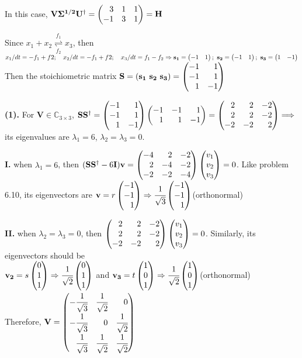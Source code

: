 \documentclass[12pt,a4paper]{article}
\begin{document}
    \noindent In this case, $\mathbf{V\Sigma^{1/2}U^\dagger}=\newvec{3&1&1\\-1&3&1}=\mathbf{H}$

    \newpage 
    Since $x_1+x_2\stackrel{f_1}{\underset{f_2}{\rightleftharpoons}}x_3$, then \\
    $x_1/dt=-f_1+f2;\quad x_2/dt=-f_1+f2;\quad x_3/dt=f_1-f_2\Rightarrow
    \\ \mathbf{s_1}=\newvec{-1&1};\ \mathbf{s_2}=\newvec{-1&1};\ \mathbf{s_3}=\newvec{1&-1}$\\
    Then the stoichiometric matrix $\mathbf{S=(s_1\ s_2\ s_3)}=\newvec{-1&1\\-1&1\\1&-1}$

    \noindent \textbf{(1).} For $\mathbf{V}\in\mathbb{C}_{3\times 3}$, $\mathbf{SS^\dagger}=\newvec{-1&1\\-1&1\\1&-1}\newvec{-1&-1&1\\1&1&-1}=\newvec{2&2&-2\\2&2&-2\\-2&-2&2}\Longrightarrow$ its eigenvalues are $\lambda_1=6$, $\lambda_2=\lambda_3=0$. 

    \noindent \textbf{I.} when $\lambda_1=6$, then $\mathbf{(SS^\dagger-\textnormal{6}I)v}=\newvec{-4&2&-2\\2&-4&-2\\-2&-2&-4}\newvec{v_1\\v_2\\v_3}=0$. Like problem 6.10, its eigenvectors are $\mathbf{v}=r\newvec{-1\\-1\\1}\Rightarrow\sqrtfrac{1}{3}\newvec{-1\\-1\\1}$(orthonormal)

    \noindent \textbf{II.} when $\lambda_2=\lambda_3=0$, then $\newvec{2&2&-2\\2&2&-2\\-2&-2&2}\newvec{v_1\\v_2\\v_3}=0$. Similarly, its eigenvectors should be \\
    $\mathbf{v_2}=s\newvec{0\\1\\1}\Rightarrow\sqrtfrac{1}{2}\newvec{0\\1\\1}$ and $\mathbf{v_3}=t\newvec{1\\0\\1}\Rightarrow\sqrtfrac{1}{2}\newvec{1\\0\\1}$(orthonormal)\\
    Therefore, $\mathbf{V}=\newvec{-\sqrtfrac{1}{3}&\sqrtfrac{1}{2}&0\\-\sqrtfrac{1}{3}&0&\sqrtfrac{1}{2}\\\sqrtfrac{1}{3}&\sqrtfrac{1}{2}&\sqrtfrac{1}{2}}$
\end{document}

